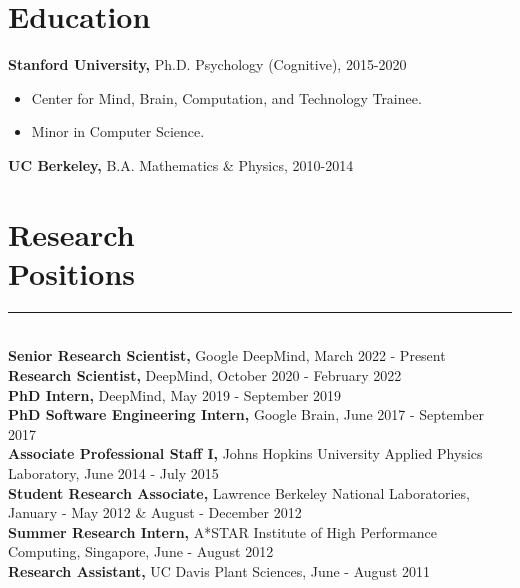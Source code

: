 \documentclass[margin]{res}
\begin{document}
 
 
 
\address{{\bf Email} \\ andrewlampinen@gmail.com}
\address{{\bf Website} \\\url{https://lampinen.github.io}}
\begin{resume} 
\section{Education} 
{\bf Stanford University,} Ph.D. Psychology (Cognitive), 2015-2020
\begin{itemize} \itemsep -2pt \item Center for Mind, Brain, Computation, and Technology Trainee. \item Minor in Computer Science.\end{itemize}
{\bf UC Berkeley,}  B.A. Mathematics \& Physics, 2010-2014%
\vspace{1pt}\section{Research\\Positions} \vspace{-15pt} \rule{\textwidth}{0.5pt} \\[3pt]
{\bf Senior Research Scientist,} Google DeepMind, March 2022 - Present\\[0.1em] 
{\bf Research Scientist,} DeepMind, October 2020 - February 2022\\[0.1em]
{\bf PhD Intern,} DeepMind, May 2019 - September 2019\\[0.1em]
{\bf PhD Software Engineering Intern,} Google Brain, June 2017 - September 2017\\[0.1em]
{\bf Associate Professional Staff I,} Johns Hopkins University Applied Physics Laboratory, June 2014 - July 2015\\[0.1em] 
{\bf Student Research Associate,} Lawrence Berkeley National Laboratories, January - May 2012 \& August - December 2012\\[0.1em]
{\bf Summer Research Intern,} A*STAR Institute of High Performance Computing, Singapore, June - August 2012\\[0.1em]
{\bf Research Assistant,} UC Davis Plant Sciences, June - August 2011
\vspace{1pt}

\end{resume}
\end{document}
